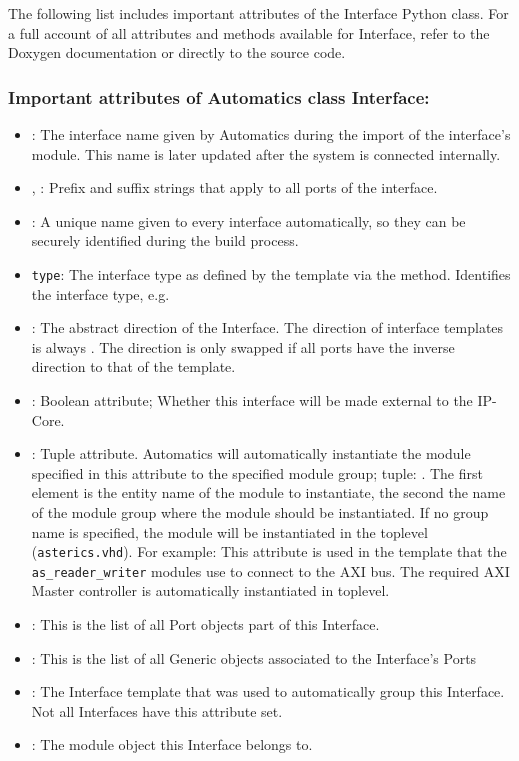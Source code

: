 The following list includes important attributes of the Interface Python class.
For a full account of all attributes and methods available for Interface, refer to the Doxygen documentation or directly to the source code.

\subsubsection*{Important attributes of Automatics class Interface:}
\begin{itemize}
\item {}: The interface name given by Automatics during the import of the interface's module. This name is later updated after the system is connected internally.
\item {}, : Prefix and suffix strings that apply to all ports of the interface.
\item {}: A unique name given to every interface automatically, so they can be securely identified during the build process.
\item \texttt{\footnotesize type}: The interface type as defined by the template via the  method. Identifies the interface type, e.g. 
\item {}: The abstract direction of the Interface. The direction of interface templates is always . The direction is only swapped if all ports have the inverse direction to that of the template.
\item {}: Boolean attribute; Whether this interface will be made external to the \asterics IP-Core.
\item {}: Tuple attribute. Automatics will automatically instantiate the module specified in this attribute to the specified module group; tuple: . The first element is the entity name of the module to instantiate, the second the name of the module group where the module should be instantiated. If no group name is specified, the module will be instantiated in the toplevel (\texttt{asterics.vhd}). 
For example: This attribute is used in the  template that the \texttt{as\_reader\_writer} modules use to connect to the AXI bus. The required AXI Master controller is automatically instantiated in toplevel.
\item {}: This is the list of all Port objects part of this Interface.
\item {}: This is the list of all Generic objects associated to the Interface's Ports
\item {}: The Interface template that was used to automatically group this Interface. Not all Interfaces have this attribute set.
\item {}: The module object this Interface belongs to.
\end{itemize}

